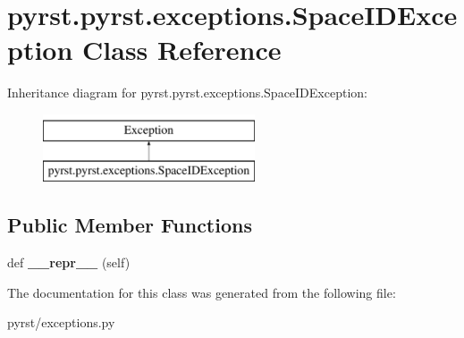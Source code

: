 \hypertarget{classpyrst_1_1pyrst_1_1exceptions_1_1_space_i_d_exception}{}\section{pyrst.\+pyrst.\+exceptions.\+Space\+I\+D\+Exception Class Reference}
\label{classpyrst_1_1pyrst_1_1exceptions_1_1_space_i_d_exception}
Inheritance diagram for pyrst.\+pyrst.\+exceptions.\+Space\+I\+D\+Exception\+:\begin{figure}[H]
\begin{center}
\leavevmode
\includegraphics[height=2.000000cm]{classpyrst_1_1pyrst_1_1exceptions_1_1_space_i_d_exception}
\end{center}
\end{figure}
\subsection*{Public Member Functions}
\begin{DoxyCompactItemize}
\item 
\hypertarget{classpyrst_1_1pyrst_1_1exceptions_1_1_space_i_d_exception_a3fff28c3727c09e36c3c757989d175d3}{}def {\bfseries \+\_\+\+\_\+repr\+\_\+\+\_\+} (self)\label{classpyrst_1_1pyrst_1_1exceptions_1_1_space_i_d_exception_a3fff28c3727c09e36c3c757989d175d3}

\end{DoxyCompactItemize}


The documentation for this class was generated from the following file\+:\begin{DoxyCompactItemize}
\item 
pyrst/exceptions.\+py\end{DoxyCompactItemize}
